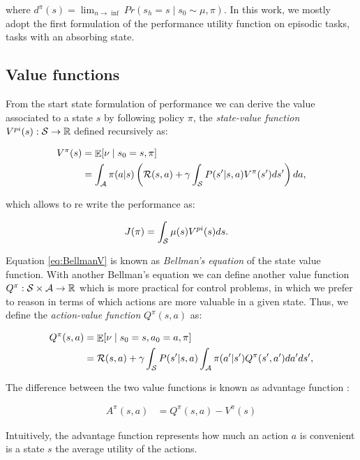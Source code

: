 where $d^{\pi}(s) = \lim_{n\to\inf} Pr(s_h=s\mid s_0\sim\mu,\pi)$. In this work, we mostly adopt the first formulation of the performance utility function on episodic tasks, \ie tasks with an absorbing state.

\subsection{Value functions}
From the start state formulation of performance we can derive the value associated to a state $s$ by following  policy $\pi$, \ie the \emph{state-value function} $V^{pi}(s):\mathcal{S}\to\mathbb{R}$ defined recursively as:

\begin{align}
V^{\pi}(s)
&=  \mathop{\mathbb{E}}[\nu\mid s_0=s,\pi]\\
&=  \int_{\mathcal{A}}\pi(a|s)\left(\mathcal{R}(s,a)+\gamma\int_{\mathcal{S}}P(s'|s, a)V^{\pi}(s')ds'\right)da \label{eq:BellmanV},
\end{align}

which allows to re write the performance as:

\begin{align}
J(\pi) &=  \int_{\mathcal{S}}\mu(s)V^{pi}(s)ds.
\end{align}


Equation \ref{eq:BellmanV} is known as \emph{Bellman's equation} of the state value function. With another Bellman's equation we can define another value function $Q^{\pi}:\mathcal{S}\times\mathcal{A}\to\mathbb{R}$ which is more practical for control problems, in which we prefer to reason in terms of which actions are more valuable in a given state. Thus, we define the \emph{action-value function} $Q^{\pi}(s,a)$ as:

\begin{align}
Q^{\pi}(s,a)
&=  \mathop{\mathbb{E}}[\nu\mid s_0=s,a_0=a,\pi] \nonumber \\
&=  \mathcal{R}(s,a) + \gamma\int_{\mathcal{S}}P(s'|s, a)\int_{\mathcal{A}}\pi(a'|s')Q^{\pi}(s', a')da'ds' \label{eq:BellmanQ},
\end{align}

The difference between the two value functions is known as advantage function \cite{baird1993advantage}:

\begin{align}
A^{\pi}(s,a) &=  Q^{\pi}(s,a) - V^{\pi}(s)
\end{align}

Intuitively, the advantage function represents how much an action $a$ is convenient is a state $s$ \wrt the average utility of the actions.

